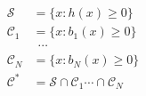 \documentclass[preview]{standalone}
\begin{document}
\begin{align*}
\mathcal{S} &= \{ x : h(x) \geq 0 \}\\ \mathcal{C}_1 &= \{ x : b_1(x) \geq 0 \}\\ & \ \ \cdots\\  \mathcal{C}_N &= \{ x : b_N(x) \geq 0 \}\\ \mathcal{C}^* &= \mathcal{S} \cap \mathcal{C}_1 \cdots \cap \mathcal{C}_N
\end{align*}
\end{document}
